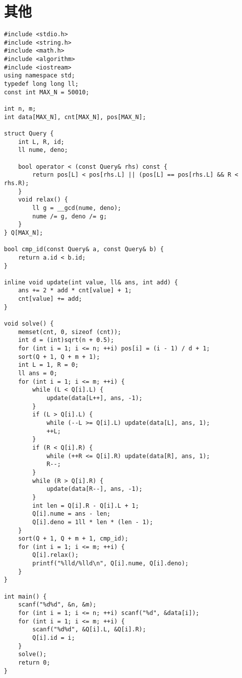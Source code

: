 \section{其他}
\begin{lstlisting}
#include <stdio.h>
#include <string.h>
#include <math.h>
#include <algorithm>
#include <iostream>
using namespace std;
typedef long long ll;
const int MAX_N = 50010;

int n, m;
int data[MAX_N], cnt[MAX_N], pos[MAX_N];

struct Query {
    int L, R, id;
    ll nume, deno;

    bool operator < (const Query& rhs) const {
        return pos[L] < pos[rhs.L] || (pos[L] == pos[rhs.L] && R < rhs.R);
    }
    void relax() {
        ll g = __gcd(nume, deno);
        nume /= g, deno /= g;
    }
} Q[MAX_N];

bool cmp_id(const Query& a, const Query& b) {
    return a.id < b.id;
}

inline void update(int value, ll& ans, int add) {
    ans += 2 * add * cnt[value] + 1;
    cnt[value] += add;
}

void solve() {
    memset(cnt, 0, sizeof (cnt));
    int d = (int)sqrt(n + 0.5);
    for (int i = 1; i <= n; ++i) pos[i] = (i - 1) / d + 1;
    sort(Q + 1, Q + m + 1);
    int L = 1, R = 0;
    ll ans = 0;
    for (int i = 1; i <= m; ++i) {
        while (L < Q[i].L) {
            update(data[L++], ans, -1);
        }
        if (L > Q[i].L) {
            while (--L >= Q[i].L) update(data[L], ans, 1);
            ++L;
        }
        if (R < Q[i].R) {
            while (++R <= Q[i].R) update(data[R], ans, 1);
            R--;
        }
        while (R > Q[i].R) {
            update(data[R--], ans, -1);
        }
        int len = Q[i].R - Q[i].L + 1;
        Q[i].nume = ans - len;
        Q[i].deno = 1ll * len * (len - 1);
    }
    sort(Q + 1, Q + m + 1, cmp_id);
    for (int i = 1; i <= m; ++i) {
        Q[i].relax();
        printf("%lld/%lld\n", Q[i].nume, Q[i].deno);
    }
}

int main() {
    scanf("%d%d", &n, &m);
    for (int i = 1; i <= n; ++i) scanf("%d", &data[i]);
    for (int i = 1; i <= m; ++i) {
        scanf("%d%d", &Q[i].L, &Q[i].R);
        Q[i].id = i;
    }
    solve();
    return 0;
}
\end{lstlisting}


